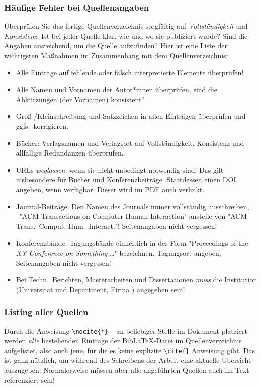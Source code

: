 \subsubsection{Häufige Fehler bei Quellenangaben}

Überprüfen Sie das fertige Quellenverzeichnis sorgfältig auf
\emph{Vollständigkeit} und \emph{Konsistenz}. Ist bei jeder Quelle klar, wie
und wo sie publiziert wurde? Sind die Angaben ausreichend, um die Quelle
aufzufinden? Hier ist eine Liste der wichtigsten Maßnahmen im Zusammenhang
mit dem Quellenverzeichnis:
%
\begin{itemize}
    \item Alle Einträge auf fehlende oder falsch interpretierte Elemente
	überprüfen!
    \item Alle Namen und Vornamen der Autor*innen überprüfen, sind die
	Abkürzungen (der Vornamen) konsistent?
    \item Groß-/Kleinschreibung und Satzzeichen in allen Einträgen überprüfen
	und ggfs.\ korrigieren.
    \item Bücher: Verlagsnamen und Verlagsort auf Vollständigkeit, Konsistenz
	und allfällige Redundanzen überprüfen.
    \item URLs \emph{weglassen}, wenn sie nicht unbedingt notwendig sind! Das
	gilt insbesondere für Bücher und Konferenzbeiträge. Stattdessen einen DOI
    angeben, wenn verfügbar. Dieser wird im PDF auch verlinkt.
    \item Journal-Beiträge: Den Namen des Journals immer vollständig
	ausschreiben, \zB\ "ACM Transactions on Computer-Human Interaction"
	anstelle von "ACM Trans.\ Comput.-Hum.\ Interact."! Seitenangaben nicht
	vergessen!
    \item Konferenzbände: Tagungsbände einheitlich in der Form "Proceedings of
	the \emph{XY Conference on Something} \ldots" bezeichnen. Tagungsort
	angeben, Seitenangaben nicht vergessen!
    \item Bei Techn.\ Berichten, Masterarbeiten und Dissertationen \emph{muss}
	die Institution (Universität und Department, Firma \etc) angegeben sein!
\end{itemize}

\subsubsection{Listing aller Quellen}

Durch die Anweisung \verb!\nocite{*}! -- an beliebiger Stelle im Dokument
platziert -- werden \emph{alle} bestehenden Einträge der BibLaTeX-Datei im
Quellenverzeichnis aufgelistet, also auch jene, für die es keine explizite
\verb!\cite{}! Anweisung gibt. Das ist ganz nützlich, um während des
Schreibens der Arbeit eine aktuelle Übersicht auszugeben. Normalerweise
müssen aber alle angeführten Quellen auch im Text referenziert sein!


